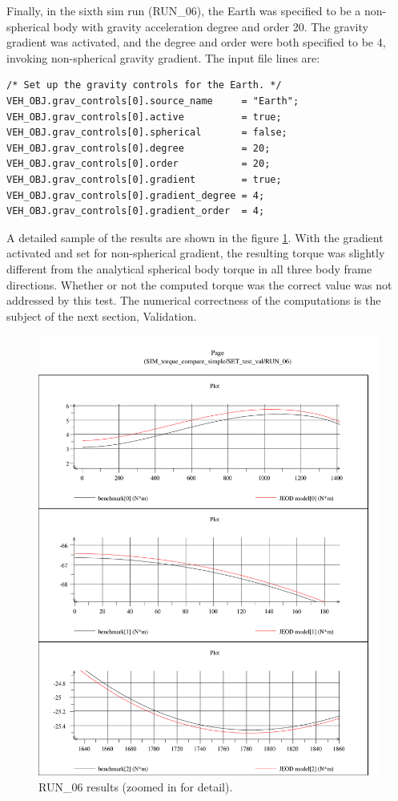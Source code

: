 Finally, in the sixth sim run (RUN\_06), the Earth was specified to be a
non-spherical body with gravity acceleration degree and order 20.
The gravity gradient was activated, and the degree and order were
both specified to be 4, invoking non-spherical gravity gradient. 
The input file lines are:
\begin{verbatim}
/* Set up the gravity controls for the Earth. */
VEH_OBJ.grav_controls[0].source_name     = "Earth";
VEH_OBJ.grav_controls[0].active          = true;
VEH_OBJ.grav_controls[0].spherical       = false;
VEH_OBJ.grav_controls[0].degree          = 20;
VEH_OBJ.grav_controls[0].order           = 20;
VEH_OBJ.grav_controls[0].gradient        = true;
VEH_OBJ.grav_controls[0].gradient_degree = 4;
VEH_OBJ.grav_controls[0].gradient_order  = 4;
\end{verbatim}
A detailed sample of the results are shown in the figure \ref{fig:run06_results}.
With the gradient activated and set for non-spherical gradient, 
the resulting torque was slightly different from the analytical spherical
body torque in all three body frame directions. Whether or not the 
computed torque was the correct value was not addressed by this test.
The numerical correctness of the computations is the subject of the
next section, Validation.
\begin{figure}[h!]
\centering
\includegraphics[width=6.1in]{figs/run_06.pdf}
\caption{RUN\_06 results (zoomed in for detail).}
\label{fig:run06_results}
\end{figure}
\newpage

